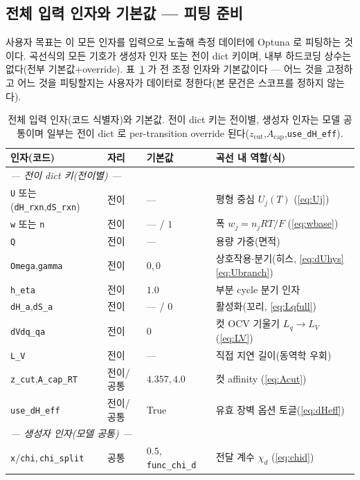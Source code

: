 \documentclass[11pt,a4paper]{article}
\newcommand{\code}[1]{\texttt{#1}}
\begin{document}
\subsection{전체 입력 인자와 기본값 — 피팅 준비}
사용자 목표는 이 모든 인자를 입력으로 노출해 측정 데이터에 Optuna 로 피팅하는 것이다. 곡선식의 모든 기호가 생성자 인자
또는 전이 dict 키이며, 내부 하드코딩 상수는 없다(전부 기본값$+$override). 표~\ref{tab:inputs} 가 전 조정 인자와
기본값이다 — 어느 것을 고정하고 어느 것을 피팅할지는 사용자가 데이터로 정한다(본 문건은 스코프를 정하지 않는다).

\begin{table}[t]
\centering\footnotesize
\renewcommand{\arraystretch}{1.18}
\caption{전체 입력 인자(코드 식별자)와 기본값. 전이 dict 키는 전이별, 생성자 인자는 모델 공통이며 일부는 전이 dict 로
per-transition override 된다($z_\mathrm{cut}$,$A_\mathrm{cap}$,\code{use\_dH\_eff}).}
\label{tab:inputs}
\begin{tabular}{l l l l}
\toprule
인자(코드) & 자리 & 기본값 & 곡선 내 역할(식) \\
\midrule
\multicolumn{4}{l}{\emph{— 전이 dict 키(전이별) —}}\\
\code{U} 또는 (\code{dH\_rxn},\code{dS\_rxn}) & 전이 & --- & 평형 중심 $U_j(T)$ (\eqref{eq:Uj}) \\
\code{w} 또는 \code{n} & 전이 & --- / $1$ & 폭 $w_j=n_jRT/F$ (\eqref{eq:wbase}) \\
\code{Q} & 전이 & --- & 용량 가중(면적) \\
\code{Omega},\code{gamma} & 전이 & $0$,\,$0$ & 상호작용$\cdot$분기(히스, \eqref{eq:dUhys}\eqref{eq:Ubranch}) \\
\code{h\_eta} & 전이 & $1.0$ & 부분 cycle 분기 인자 \\
\code{dH\_a},\code{dS\_a} & 전이 & --- / $0$ & 활성화(꼬리, \eqref{eq:Lqfull}) \\
\code{dVdq\_qa} & 전이 & $0$ & 컷 OCV 기울기 $L_q\!\to\!L_V$ (\eqref{eq:LV}) \\
\code{L\_V} & 전이 & --- & 직접 지연 길이(동역학 우회) \\
\code{z\_cut},\code{A\_cap\_RT} & 전이/공통 & $4.357$,\,$4.0$ & 컷 affinity (\eqref{eq:Acut}) \\
\code{use\_dH\_eff} & 전이/공통 & True & 유효 장벽 옵션 토글(\eqref{eq:dHeff}) \\
\multicolumn{4}{l}{\emph{— 생성자 인자(모델 공통) —}}\\
\code{x}/\code{chi},\,\code{chi\_split} & 공통 & $0.5$,\,\code{func\_chi\_d} & 전달 계수 $\chi_d$ (\eqref{eq:chid}) \\

\end{tabular}
\end{table}
\end{document}

